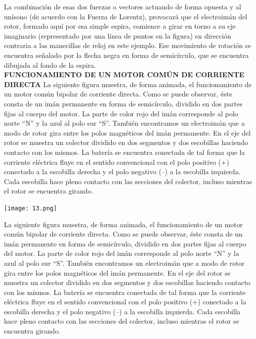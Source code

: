 \documentclass[10pt,a4paper]{article}
\begin{document}
La combinación de esas dos fuerzas o vectores actuando de forma opuesta y al unísono (de acuerdo con la Fuerza de Lorentz), provocará que el electroimán del rotor, formado aquí por esa simple espira, comience a girar en torno a su eje imaginario (representado por una línea de puntos en la figura) en dirección contraria a las manecillas de reloj en este ejemplo. Ese movimiento de rotación se encuentra señalado por la flecha negra en forma de semicírculo, que se encuentra dibujada al fondo de la espira.\\
\textbf{FUNCIONAMIENTO DE UN MOTOR COMÚN DE CORRIENTE DIRECTA}
La siguiente figura muestra, de forma animada, el funcionamiento de un motor común bipolar de corriente directa. Como se puede observar, éste consta de un imán permanente en forma de semicírculo, dividido en dos partes fijas al cuerpo del motor. La parte de color rojo del imán corresponde al polo norte “N” y la azul al polo sur “S”. También encontramos un electroimán que a modo de rotor gira entre los polos magnéticos del imán permanente. En el eje del rotor se muestra un colector dividido en dos segmentos y dos escobillas haciendo contacto con los mismos. La batería se encuentra conectada de tal forma que la corriente eléctrica fluye en el sentido convencional con el polo positivo (+) conectado a la escobilla derecha y el polo negativo (–) a la escobilla izquierda. Cada escobilla hace pleno contacto con las secciones del colector, incluso mientras el rotor se encuentra girando.

\begin{center}
\texttt{[image: 13.png]} 
\end{center}

La siguiente figura muestra, de forma animada, el funcionamiento de un motor común bipolar de corriente directa. Como se puede observar, éste consta de un imán permanente en forma de semicírculo, dividido en dos partes fijas al cuerpo del motor. La parte de color rojo del imán corresponde al polo norte “N” y la azul al polo sur “S”. También encontramos un electroimán que a modo de rotor gira entre los polos magnéticos del imán permanente. En el eje del rotor se muestra un colector dividido en dos segmentos y dos escobillas haciendo contacto con los mismos. La batería se encuentra conectada de tal forma que la corriente eléctrica fluye en el sentido convencional con el polo positivo (+) conectado a la escobilla derecha y el polo negativo (–) a la escobilla izquierda. Cada escobilla hace pleno contacto con las secciones del colector, incluso mientras el rotor se encuentra girando.\\
\end{document}
